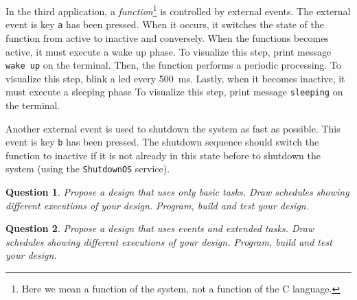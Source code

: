 \documentclass[11pt]{report}
\newtheorem{ex}{Question}
\begin{document}
In the third application, a \textit{function}\footnote{Here we mean a function of the system, not a function of the C language.} is controlled by external events.
The external event is key \verb-a- has been pressed.
When it occurs, it switches the state of the function from active to inactive and conversely.
When the functions becomes active, it must execute a wake up phase.
To visualize this step, print message \verb-wake up- on the terminal.
Then, the function performs a periodic processing.
To visualize this step, blink a led every \SI{500}{\milli\second}.
Lastly, when it becomes inactive, it must execute a sleeping phase
To visualize this step, print message \verb-sleeping- on the terminal.

Another external event is used to shutdown the system as fast as possible.
This event is key \verb-b- has been pressed.
The shutdown sequence should switch the function to inactive if it is not already in this state before to shutdown the system (using the \texttt{ShutdownOS} service).

\begin{center}
\end{center}

\begin{ex}
  Propose a design that uses only basic tasks.
  Draw schedules showing different executions of your design.
  Program, build and test your design.
\end{ex}

\begin{ex}
  Propose a design that uses events and extended tasks.
  Draw schedules showing different executions of your design.
  Program, build and test your design.
\end{ex}
\end{document}
